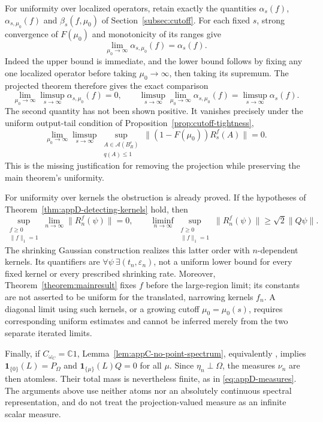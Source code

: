 \documentclass[a4paper,11pt]{article}
\theoremstyle{definition}
\begin{document}
For uniformity over localized operators, retain exactly the quantities
$\alpha_s(f)$, $\alpha_{s,\mu_0}(f)$ and $\beta_s(f,\mu_0)$ of
Section~\ref{subsec:cutoff}. For each fixed $s$, strong convergence of
$F(\mu_0)$ and monotonicity of its ranges give
\[
 \lim_{\mu_0\to\infty}\alpha_{s,\mu_0}(f)=\alpha_s(f).
\]
Indeed the upper bound is immediate, and the lower bound follows by fixing
any one localized operator before taking $\mu_0\to\infty$, then taking its
supremum. The projected theorem therefore gives the exact comparison
\begin{equation}
 \lim_{\mu_0\to\infty}\limsup_{s\to\infty}\alpha_{s,\mu_0}(f)=0,
 \qquad
 \limsup_{s\to\infty}\lim_{\mu_0\to\infty}\alpha_{s,\mu_0}(f)
 =\limsup_{s\to\infty}\alpha_s(f).
 \label{eq:appD-uniform-order}
\end{equation}
The second quantity has not been shown positive. It vanishes precisely under
the uniform output-tail condition of Proposition~\ref{prop:cutoff-tightness},
\[
 \lim_{\mu_0\to\infty}\limsup_{s\to\infty}
 \sup_{\substack{A\in\mathcal A(B_R^r)\\q(A)\le1}}
 \|(1-F(\mu_0))R_s^f(A)\|=0.
\]
This is the missing justification for removing the projection while preserving
the main theorem's uniformity.

For uniformity over kernels the obstruction is already proved. If the
hypotheses of Theorem~\ref{thm:appD-detecting-kernels} hold, then
\begin{equation}
 \sup_{\substack{f\ge0\\\|f\|_1=1}}\lim_{n\to\infty}\|R_n^f(\psi)\|=0,
 \qquad
 \liminf_{n\to\infty}\sup_{\substack{f\ge0\\\|f\|_1=1}}
       \|R_n^f(\psi)\|\ge\sqrt2\|Q\psi\|.
 \label{eq:appD-kernel-order}
\end{equation}
The shrinking Gaussian construction realizes this latter order with
$n$-dependent kernels. Its quantifiers are
$\forall\psi\ \exists(t_n,\varepsilon_n)$, not a uniform lower bound for every
fixed kernel or every prescribed shrinking rate. Moreover,
Theorem~\ref{theorem:mainresult} fixes $f$ before the large-region limit;
its constants are not asserted to be uniform for the translated,
narrowing kernels $f_n$. A diagonal limit using such kernels, or a growing
cutoff $\mu_0=\mu_0(s)$, requires corresponding uniform estimates and cannot
be inferred merely from the two separate iterated limits.


Finally, if $C_{\omega_{C}}=\mathbb C1$, Lemma~\ref{lem:appC-no-point-spectrum}, equivalently \cite[Lemma~2.1]{MarrakchiVaes2024Ergodic}, implies
$\mathbf1_{\{0\}}(L)=P_\Omega$ and $\mathbf1_{\{\mu\}}(L)Q=0$ for all $\mu$.
Since $\eta_n\perp\Omega$, the measures $\nu_n$ are then atomless. Their total mass is nevertheless finite, as in \eqref{eq:appD-measures}. The arguments above use neither atoms nor an absolutely continuous spectral representation, and do not treat the projection-valued measure as an infinite scalar measure.
\end{document}
